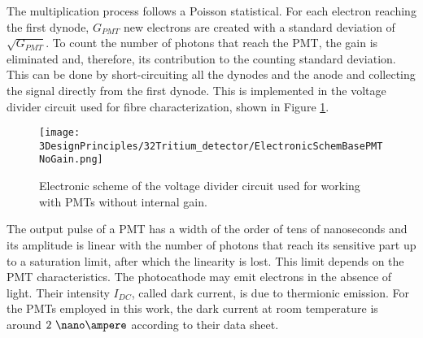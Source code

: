 \begin{enumerate}
The multiplication process follows a Poisson statistical. For each electron reaching the first dynode, $G_{PMT}$ new electrons are created with a standard deviation of $\sqrt{G_{PMT}}$. To count the number of photons that reach the PMT, the gain is eliminated and, therefore, its contribution to the counting standard deviation. This can be done by short-circuiting all the dynodes and the anode and collecting the signal directly from the first dynode. This is implemented in the voltage divider circuit used for fibre characterization, shown in Figure \ref{fig:ElectronicSchemeBasePMTNoGain}.
\begin{figure}[t]
\centering
\texttt{[image: 3DesignPrinciples/32Tritium\_detector/ElectronicSchemBasePMTNoGain.png]}
\caption{Electronic scheme of the voltage divider circuit used for working with PMTs without internal gain.\label{fig:ElectronicSchemeBasePMTNoGain}}
\end{figure}
\end{enumerate}
The output pulse of a PMT has a width of the order of tens of nanoseconds and its amplitude is linear with the number of photons that reach its sensitive part up to a saturation limit, after which the linearity is lost. This limit depends on the PMT characteristics. The photocathode may emit electrons in the absence of light. Their intensity $I_{DC}$, called dark current, is due to thermionic emission. For the PMTs employed in this work, the dark current at room temperature is around $2~\nano\ampere$ according to their data sheet.

